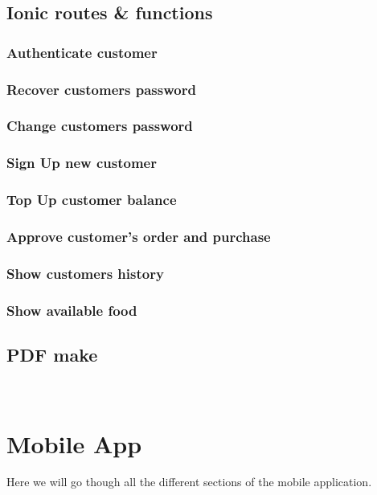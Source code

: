 	\subsection{Ionic routes \& functions}
		\subsubsection{Authenticate customer}
		\subsubsection{Recover customers password}
		\subsubsection{Change customers password}
		\subsubsection{Sign Up new customer}
		\subsubsection{Top Up customer balance}
		\subsubsection{Approve customer's order and purchase}
		\subsubsection{Show customers history}
		\subsubsection{Show available food}
	
	

\subsection{PDF make}

~\cite{PDF_Make_module}

\pagebreak
  \section{Mobile App}
Here we will go though all the different sections of the mobile application.

